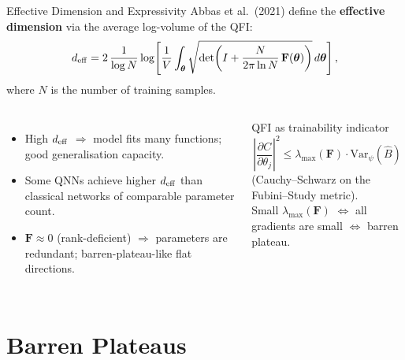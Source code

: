 \documentclass[aspectratio=169,11pt]{beamer}
\newcommand{\btheta}{\boldsymbol{\theta}}
\newcommand{\QFI}{\mathbf{F}}
\newcommand{\Variance}{\mathrm{Var}}
\begin{document}
\begin{frame}{Effective Dimension and Expressivity}
  Abbas et al.\ (2021) define the \textbf{effective dimension}
  via the average log-volume of the QFI:
  \[
    d_{\rm eff}
    = 2\,\frac{1}{\log N}
      \log\!\left[\frac{1}{V}\int_{\btheta}
        \sqrt{\det\!\left(
          I + \frac{N}{2\pi\ln N}\,\QFI(\btheta)
        \right)}\,d\btheta\right],
  \]
  where $N$ is the number of training samples.

  \medskip
  \begin{columns}[T]
    \begin{itemize}
      \item High $d_{\rm eff}$ $\Rightarrow$ model fits many
            functions; good generalisation capacity.
      \item Some QNNs achieve higher $d_{\rm eff}$ than
            classical networks of comparable parameter count.
      \item $\QFI\approx 0$ (rank-deficient) $\Rightarrow$
            parameters are redundant; barren-plateau-like
            flat directions.
    \end{itemize}
    \begin{block}{QFI as trainability indicator}
      \[
        \left|\frac{\partial C}{\partial\theta_j}\right|^2
        \leq \lambda_{\max}(\QFI)\cdot\Variance_\psi(\hat{B})
      \]
      (Cauchy--Schwarz on the Fubini--Study metric).\\[4pt]
      Small $\lambda_{\max}(\QFI)$
      $\Leftrightarrow$ all gradients are small
      $\Leftrightarrow$ barren plateau.
    \end{block}
  \end{columns}
\end{frame}

\section{Barren Plateaus}
\end{document}
